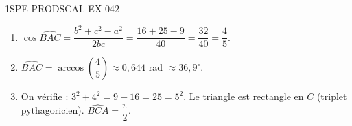 \begin{corrige}{1SPE-PRODSCAL-EX-042}
\begin{enumerate}
\item $\cos\widehat{BAC} = \dfrac{b^2 + c^2 - a^2}{2bc} = \dfrac{16 + 25 - 9}{40} = \dfrac{32}{40} = \dfrac{4}{5}$.
\item $\widehat{BAC} = \arccos\!\left(\dfrac{4}{5}\right) \approx 0{,}644$ rad $\approx 36{,}9^\circ$.
\item On vérifie : $3^2 + 4^2 = 9 + 16 = 25 = 5^2$. Le triangle est rectangle en $C$ (triplet pythagoricien). $\widehat{BCA} = \dfrac{\pi}{2}$.
\end{enumerate}
\end{corrige}
